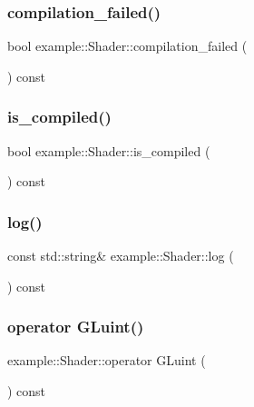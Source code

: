 \subsubsection{\texorpdfstring{compilation\+\_\+failed()}{compilation\_failed()}}
{\footnotesize\ttfamily bool example\+::\+Shader\+::compilation\+\_\+failed (\begin{DoxyParamCaption}{ }\end{DoxyParamCaption}) const\hspace{0.3cm}{\ttfamily [inline]}}

\mbox{\label{classexample_1_1_shader_abd0acb5a26b8829d6e81908b487fa329}} 
\subsubsection{\texorpdfstring{is\+\_\+compiled()}{is\_compiled()}}
{\footnotesize\ttfamily bool example\+::\+Shader\+::is\+\_\+compiled (\begin{DoxyParamCaption}{ }\end{DoxyParamCaption}) const\hspace{0.3cm}{\ttfamily [inline]}}

\mbox{\label{classexample_1_1_shader_a4d5153ab0443d4747e076ad9e6d88d1c}} 
\subsubsection{\texorpdfstring{log()}{log()}}
{\footnotesize\ttfamily const std\+::string\& example\+::\+Shader\+::log (\begin{DoxyParamCaption}{ }\end{DoxyParamCaption}) const\hspace{0.3cm}{\ttfamily [inline]}}

\mbox{\label{classexample_1_1_shader_aa2639e785a366ebe1837e550833150e8}} 
\subsubsection{\texorpdfstring{operator G\+Luint()}{operator GLuint()}}
{\footnotesize\ttfamily example\+::\+Shader\+::operator G\+Luint (\begin{DoxyParamCaption}{ }\end{DoxyParamCaption}) const\hspace{0.3cm}{\ttfamily [inline]}}



